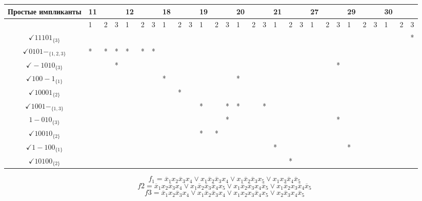 \begin{longtable}[]{@{}clllllllllllllllllllllllllll@{}}
\toprule
Простые импликанты & 11 & & & 12 & & & 18 & & & 19 & & & 20 & & & 21 & &
& 27 & & & 29 & & & 30 & &\tabularnewline
\midrule
\endhead
& 1 & 2 & 3 & 1 & 2 & 3 & 1 & 2 & 3 & 1 & 2 & 3 & 1 & 2 & 3 & 1 & 2 & 3
& 1 & 2 & 3 & 1 & 2 & 3 & 1 & 2 & 3\tabularnewline
\(\checkmark 11101_{\{3\}}\) & & & & & & & & & & & & & & & & & & & & & &
& & & & & *\tabularnewline
\(\checkmark0101-_{\{1,2,3\}}\) & * & * & * & * & * & * & & & & & & & &
& & & & & & & & & & & & &\tabularnewline
\(\checkmark-1010_{\{3\}}\) & & & * & & & & & & & & & & & & & & & & & &
* & & & & & &\tabularnewline
\(\checkmark100-1_{\{1\}}\) & & & & & & & * & & & & & & * & & & & & & &
& & & & & & &\tabularnewline
\(\checkmark10001_{\{2\}}\) & & & & & & & & * & & & & & & & & & & & & &
& & & & & &\tabularnewline
\(\checkmark 1001-_{\{1,3\}}\) & & & & & & & & & & * & & * & * & & * & &
& & & & & & & & & &\tabularnewline
\(1-010_{\{3\}}\) & & & & & & & & & & & & * & & & & & & & & & * & & & &
& &\tabularnewline
\(\checkmark10010_{\{2\}}\) & & & & & & & & & & * & * & & & & & & & & &
& & & & & & &\tabularnewline
\(\checkmark 1-100_{\{1\}}\) & & & & & & & & & & & & & & & & * & & & & &
& * & & & & &\tabularnewline
\(\checkmark10100_{\{2\}}\) & & & & & & & & & & & & & & & & & * & & & &
& & & & & &\tabularnewline
\bottomrule
\end{longtable}

\[f_1 = \overline x_1 x_2 \overline x_3 x_4  \lor x_1 \overline x_2 \overline x_3 x_4 \lor x_1 \overline x_2 \overline x_3 x_5 \lor x_1 x_3 \overline x_4 \overline x_5\]
\[f2 = \overline x_1 x_2 \overline x_3 x_4  \lor x_1 \overline x_2 \overline x_3 \overline x_4 x_5 \lor x_1 \overline x_2 \overline x_3 x_4 \overline x_5 \lor x_1 \overline x_2 x_3 \overline x_4 \overline x_5\]
\[f3 = \overline x_1 x_2 \overline x_3 x_4  \lor x_1 \overline x_2 \overline x_3 x_4  \lor x_1 x_2 x_3 \overline x_4 x_5 \lor x_2 \overline x_3 x_4 \overline x_5\]

